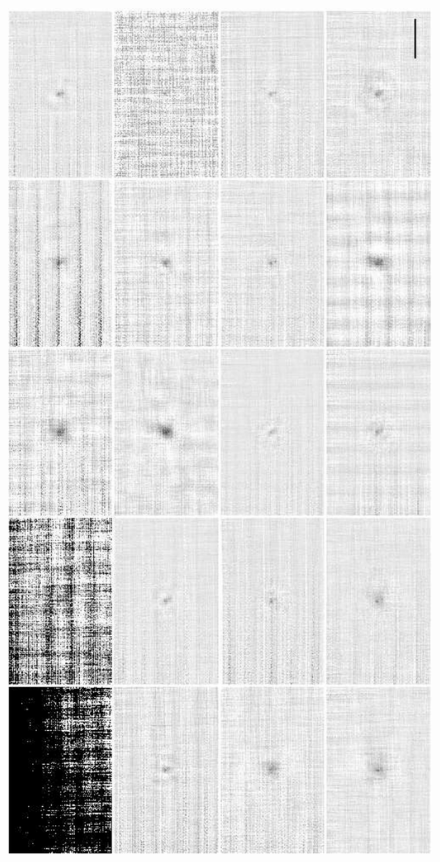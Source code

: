 \documentclass[12pt,preprint]{aastex}
\begin{document}
\begin{figure}
  \begin{minipage}{6.5in}
    \begin{center}
      \includegraphics[angle=270,scale=0.6]{f7a}%
    \end{center}

\end{minipage}
\end{figure}
\end{document}
